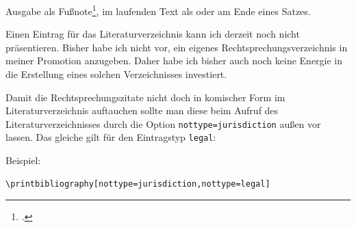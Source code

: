 


Ausgabe als Fußnote\footcite[3]{bverfg:jubilaeum}, im laufenden Text als \cite[3]{bverfg:jubilaeum}
oder am Ende eines Satzes.~\parencite[3]{bverfg:jubilaeum}

Einen Eintrag für das Literaturverzeichnis kann ich derzeit noch nicht präsentieren. Bisher habe ich nicht vor, 
ein eigenes Rechtsprechungsverzeichnis in meiner Promotion anzugeben. Daher habe ich bisher auch noch keine 
Energie in die Erstellung eines solchen Verzeichnisses investiert. 

\label{nichtinslitverz}
Damit die Rechtsprechungszitate nicht doch in komischer Form im Literaturverzeichnis auftauchen 
sollte man diese beim Aufruf des Literaturverzeichnisses durch die Option 
\texttt{nottype=jurisdiction} außen vor lassen. Das gleiche gilt für den Eintragstyp \texttt{legal}:

Beispiel: 
\begin{lstlisting}
\printbibliography[nottype=jurisdiction,nottype=legal]
\end{lstlisting}

\begin{mdframed}[
  leftmargin=0pt,
  rightmargin=0pt,
  linecolor=black, 
  backgroundcolor=black!10]
\vspace{-\normalbaselineskip}
\printbibliography[nottype=jurisdiction,nottype=legal]
\end{mdframed}

